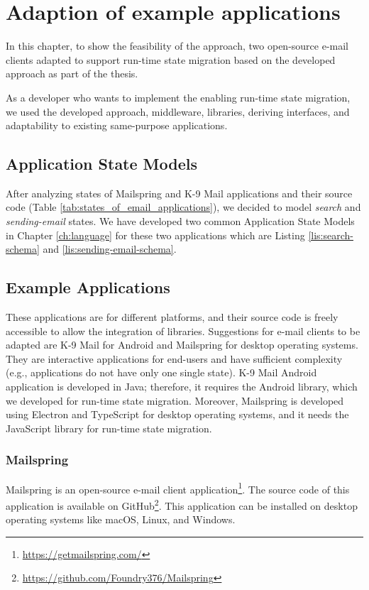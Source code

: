 \chapter{Adaption of example applications}
\label{ch:adaption}
In this chapter, to show the feasibility of the approach, two open-source e-mail clients adapted to support run-time state migration based on the developed approach as part of the thesis.

As a developer who wants to implement the enabling run-time state migration, we used the developed approach, middleware, libraries, deriving interfaces, and adaptability to existing same-purpose applications. 

\section{Application State Models}
After analyzing states of Mailspring and K-9 Mail applications and their source code (Table \ref{tab:states_of_email_applications}), we decided to model \textit{search} and \textit{sending-email} states. We have developed two common Application State Models in Chapter \ref{ch:language} for these two applications which are Listing \ref{lis:search-schema} and \ref{lis:sending-email-schema}. 



\section{Example Applications}
These applications are for different platforms, and their source code is freely accessible to allow the integration of libraries. 
Suggestions for e-mail clients to be adapted are K-9 Mail for Android and Mailspring for desktop operating systems. They are interactive applications for end-users and have sufficient complexity (e.g., applications do not have only one single state).
K-9 Mail Android application is developed in Java; therefore, it requires the Android library, which we developed for run-time state migration. Moreover, Mailspring is developed using Electron and TypeScript for desktop operating systems, and it needs the JavaScript library for run-time state migration.

\subsection{Mailspring}
Mailspring is an open-source e-mail client application\footnote{\url{https://getmailspring.com/}}. The source code of this application is available on GitHub\footnote{\url{https://github.com/Foundry376/Mailspring}}. This application can be installed on desktop operating systems like macOS, Linux, and Windows.
